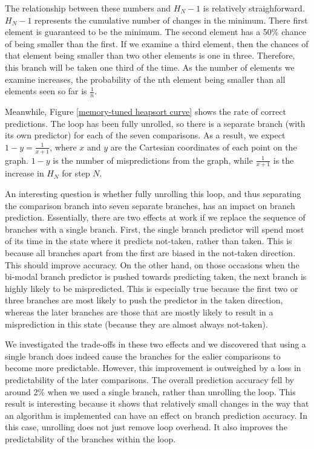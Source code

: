 The relationship between these numbers and $H_N-1$ is relatively straighforward.
$H_N-1$ represents the cumulative number of changes in the minimum. There first
element is guaranteed to be the minimum. The second element has a 50\% chance of
being smaller than the first. If we examine a third element, then the chances of
that element being smaller than two other elements is one in three. Therefore,
this branch will be taken one third of the time. As the number of elements we
examine increases, the probability of the nth element being smaller than all
elements seen so far is $\frac{1}{n}$.

Meanwhile, Figure \ref{memory-tuned heapsort curve} shows the rate of correct
predictions. The loop has been fully unrolled, so there is a separate branch
(with its own predictor) for each of the seven comparisons.  As a result, we
expect $1-y = \frac{1}{x+1}$, where $x$ and $y$ are the Cartesian coordinates of
each point on the graph. $1-y$ is the number of mispredictions from the graph,
while $\frac{1}{x+1}$ is the increase in $H_N$ for step $N$.

An interesting question is whether fully unrolling this loop, and thus
separating the comparison branch into seven separate branches, has an impact on
branch prediction. Essentially, there are two effects at work if we replace the
sequence of branches with a single branch. First, the single branch predictor
will spend most of its time in the state where it predicts not-taken, rather
than taken. This is because all branches apart from the first are biased in the
not-taken direction. This should improve accuracy. On the other hand, on those
occasions when the bi-modal branch predictor is pushed towards predicting taken,
the next branch is highly likely to be mispredicted. This is especially true
because the first two or three branches are most likely to push the predictor in
the taken direction, whereas the later branches are those that are mostly likely
to result in a misprediction in this state (because they are almost always
not-taken).

We investigated the trade-offs in these two effects and we discovered that using
a single branch does indeed cause the branches for the ealier comparisons to
become more predictable. However, this improvement is outweighed by a loss in
predictability of the later comparisons. The overall prediction accuracy fell by
around 2\% when we used a single branch, rather than unrolling the loop. This
result is interesting because it shows that relatively small changes in the way
that an algorithm is implemented can have an effect on branch prediction
accuracy. In this case, unrolling does not just remove loop overhead. It also
improves the predictability of the branches within the loop.

